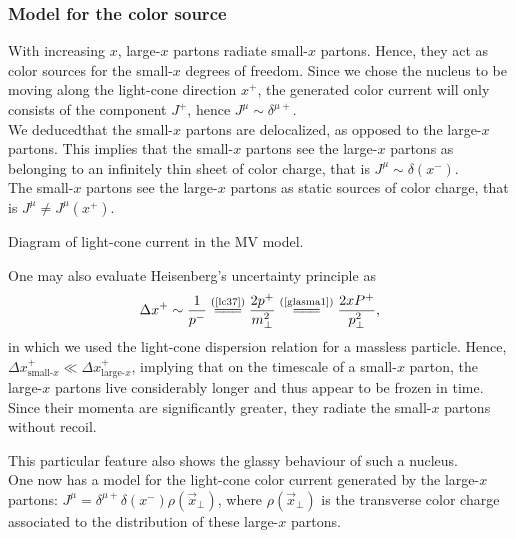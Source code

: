 \subsubsection*{Model for the color source} 
With increasing $x$, large-$x$ partons radiate small-$x$ partons. Hence, they act as color sources for the small-$x$ degrees of freedom. Since we chose the nucleus to be moving along the light-cone direction $x^+$, the generated color current will only consists of the component $J^+$, hence $J^\mu\sim\delta^{\mu+}$. \\
We deducedthat the small-$x$ partons are delocalized, as opposed to the large-$x$ partons. This implies that the small-$x$ partons see the large-$x$ partons as belonging to an {\sffamily\color{ming}infinitely thin sheet} of color charge, that is $J^\mu\sim\delta(x^-)$. \\
The small-$x$ partons see the large-$x$ partons as {\sffamily\color{ming}static sources} of color charge, that is $J^\mu\neq J^\mu(x^+)$.

\begin{marginfigure}[-5.5cm]
	\centering
    
    \caption*{Diagram of light-cone current in the {\sffamily MV} model.}
\end{marginfigure}

\begin{note}
    One may also evaluate Heisenberg's uncertainty principle as
    \begin{equation*}
        \Delta x^+\sim\frac{1}{p^-}\stackrel{(\text{\cref{lc37}})}{=\joinrel=\joinrel=}\frac{2p^+}{m_\perp^2}\stackrel{(\text{\cref{glasma1}})}{=\joinrel=\joinrel=}\frac{2xP^+}{p_\perp^2},
    \end{equation*}
    in which we used the light-cone dispersion relation for a massless particle. Hence, $\Delta x^+_{\text{small-}x}\ll \Delta x^+_{\text{large-}x}$, implying that on the timescale of a small-$x$ parton, the large-$x$ partons live considerably longer and thus appear to be frozen in time. Since their momenta are significantly greater, they radiate the small-$x$ partons without recoil.
\end{note}

This particular feature also shows the {\sffamily\color{ming}glassy behaviour} of such a nucleus. \\
One now has a model for the light-cone color current generated by the large-$x$ partons: $J^\mu=\delta^{\mu+}\delta(x^-)\rho(\vec{x}_\perp)$, where $\rho(\vec{x}_\perp)$ is the transverse color charge associated to the distribution of these large-$x$ partons. \\

